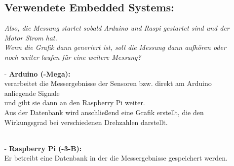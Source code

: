 \documentclass[12pt]{article}
\begin{document}
\begin{itemize}
  
\subsection*{Verwendete Embedded Systems:}
\textit{Also, die Messung startet sobald Arduino und Raspi gestartet sind und der Motor Strom hat. \\
				Wenn die Grafik dann generiert ist, soll die Messung dann aufhören oder noch weiter laufen für eine weitere Messung?}
\item[-]\textbf{Arduino (-Mega):}\\
verarbeitet die Messergebnisse der Sensoren bzw. direkt am Arduino anliegende Signale \\
und gibt sie dann an den Raspberry Pi weiter.\\
Aus der Datenbank wird anschließend eine Grafik erstellt, die den Wirkungsgrad bei verschiedenen Drehzahlen darstellt.\\\\ 

\item[-]\textbf{Raspberry Pi (-3-B):}\\
Er betreibt eine Datenbank in der die Messergebnisse gespeichert werden.\\


\end{itemize}
\end{document}
